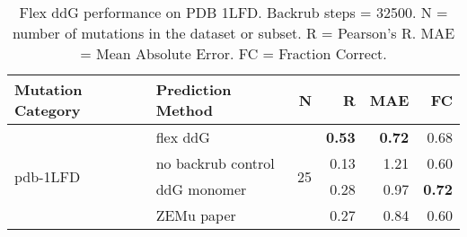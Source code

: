 \begin{table}
  \begin{tabular}{llrrrr}
\toprule
Mutation Category &   Prediction Method &   N &    R &  MAE &   FC \\
\midrule
 \multirow{ 4}{*}{pdb-1LFD} & flex ddG & \multirow{ 4}{*}{25} & \textbf{0.53} & \textbf{0.72} & 0.68  \\
 & no backrub control & & 0.13 & 1.21 & 0.60  \\
 & ddG monomer & & 0.28 & 0.97 & \textbf{0.72}  \\
 & ZEMu paper & & 0.27 & 0.84 & 0.60  \\
\bottomrule
\end{tabular}
  \caption[Flex ddG performance on PDB 1LFD]{
    Flex ddG performance on PDB 1LFD. Backrub steps = 32500. N = number of mutations in the dataset or subset. R = Pearson's R. MAE = Mean Absolute Error. FC = Fraction Correct.
  } \label{tab:table-pdb-1LFD}
\end{table}
